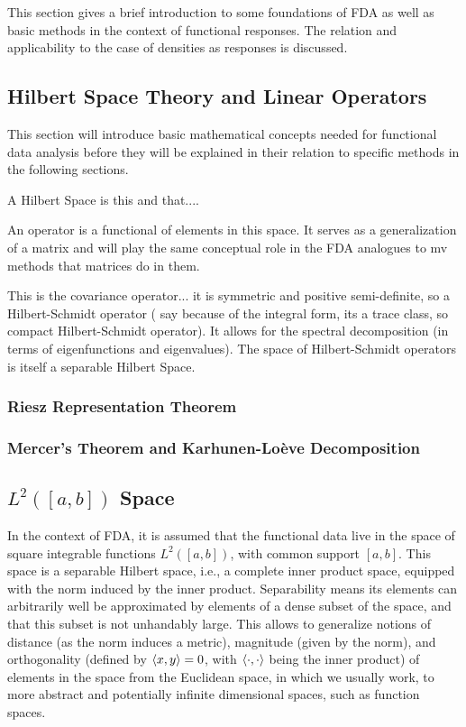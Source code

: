 This section gives a brief introduction to some foundations of FDA as well as basic
methods in the context of functional responses. The relation and applicability to the
case of densities as responses is discussed.

\subsection{Hilbert Space Theory and Linear Operators}
\label{sec:hilbert spaces}
This section will introduce basic mathematical concepts needed for functional data
analysis before they will be explained in their relation to specific methods in the
following sections.

A Hilbert Space is this and that....

An operator is a functional of elements in this space. It serves as a generalization of
a matrix and will play the same conceptual role in the FDA analogues to mv methods
that matrices do in them.

This is the covariance operator... it is symmetric and positive semi-definite, so
a Hilbert-Schmidt operator (\textcite{WangChiouMüller2016} say because of the integral form,
its a trace class, so compact Hilbert-Schmidt operator). It allows for the spectral
decomposition (in terms of eigenfunctions and eigenvalues). The space of Hilbert-Schmidt
operators is itself a separable Hilbert Space.

\subsubsection{Riesz Representation Theorem}
\label{sec:riesz}

\subsubsection{Mercer's Theorem and Karhunen-Loève Decomposition}
\label{sec:mercer and kh}

\subsection{$L^2([a, b])$ Space}
\label{sec:l2 space}
In the context of FDA, it is assumed that the functional data live in
the space of square integrable functions $L^2([a,b])$, with common
support $[a,b]$. This space is a separable Hilbert space, i.e., a complete inner
product space, equipped with the norm induced by the inner product. Separability means
its elements can arbitrarily well be approximated by elements of a dense subset of the
space, and that this subset is not unhandably large.
This allows to generalize notions of distance (as the norm induces a
metric), magnitude (given by the norm), and orthogonality (defined by
$\left \langle x, y \right \rangle = 0$, with $\left \langle \cdot, \cdot \right \rangle$ being the inner product) of elements
in the space from the Euclidean space, in which we usually work, to more
abstract and potentially infinite dimensional spaces, such as function
spaces.

